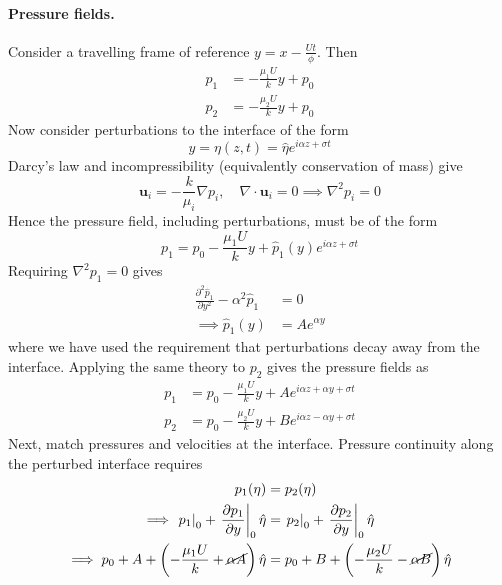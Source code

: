 \documentclass{jknotes}
\renewcommand{\u}{\symbf{u}}
\begin{document}
\paragraph{Pressure fields.}
Consider a travelling frame of reference $y = x-\frac{Ut}{\phi}$. Then
\begin{align}
	p_1 &= -\frac{\mu_1 U}{k} y + p_0 \\
	p_2 &= -\frac{\mu_2 U}{k} y + p_0
\end{align}
Now consider perturbations to the interface of the form
\begin{equation}
	y = \eta(z,t) = \hat{\eta} e^{i\alpha z + \sigma t}
\end{equation}
Darcy's law and incompressibility (equivalently conservation of mass) give
\begin{equation}
	\u_i = -\frac{k}{\mu_i} \nabla p_i, \hspace{1em} \nabla \cdot \u_i = 0
	 	 \implies \nabla^2 p_i = 0
\end{equation}
Hence the pressure field, including perturbations, must be of the form
\begin{equation}
	p_1 = p_0 - \frac{\mu_1 U}{k}y + \hat{p}_1(y)e^{i\alpha z + \sigma t}
\end{equation}
Requiring $\nabla^2 p_1 = 0$ gives
\begin{align}
	\frac{\partial^2 \hat{p}_1}{\partial y^2} - \alpha^2 \hat{p}_1 &= 0 \\
	\implies \hat{p}_1(y) &= Ae^{\alpha y} 
\end{align}
where we have used the requirement that perturbations decay away from the
interface. Applying the same theory to $p_2$ gives the pressure fields as
\begin{align}
	p_1 &= p_0 - \frac{\mu_1 U}{k} y + Ae^{i\alpha z + \alpha y + \sigma t} \\
	p_2 &= p_0 - \frac{\mu_2 U}{k} y + Be^{i\alpha z - \alpha y + \sigma t}
\end{align}
Next, match pressures and velocities at the interface. Pressure continuity
along the perturbed interface requires
\begin{align}
	p_1(\eta) &= p_2(\eta)\\
	\implies \left.p_1 \right|_0 + \left. \frac{\partial p_1}{\partial
y}\right|_0 \hat{\eta} &= \left.p_2 \right|_0 + \left. \frac{\partial p_2}{\partial
y}\right|_0 \hat{\eta} \\
\implies p_0 + A + \left(-\frac{\mu_1 U}{k} + \cancel{\alpha
A}\right)\hat{\eta} &= 
p_0 + B + \left(-\frac{\mu_2 U}{k} - \cancel{\alpha
B}\right)\hat{\eta}
\end{align}
\end{document}
